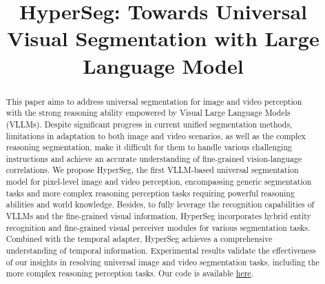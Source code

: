 \title{HyperSeg: Towards Universal Visual Segmentation with Large Language Model}




\renewcommand{\thefootnote}{\fnsymbol{footnote}}

\begin{abstract}
\indent This paper aims to address universal segmentation for image and video perception with the strong reasoning ability empowered by Visual Large Language Models (VLLMs). Despite significant progress in current unified segmentation methods, limitations in adaptation to both image and video scenarios, as well as the complex reasoning segmentation, make it difficult for them to handle various challenging instructions and achieve an accurate understanding of fine-grained vision-language correlations.
We propose HyperSeg, the first VLLM-based universal segmentation model for pixel-level image and video perception, encompassing generic segmentation tasks and more complex reasoning perception tasks requiring powerful reasoning abilities and world knowledge.
Besides, to fully leverage the recognition capabilities of VLLMs and the fine-grained visual information, HyperSeg incorporates hybrid entity recognition and fine-grained visual perceiver modules for various segmentation tasks. 
Combined with the temporal adapter, HyperSeg achieves a comprehensive understanding of temporal information. 
Experimental results validate the effectiveness of our insights in resolving universal image and video segmentation tasks, including the more complex reasoning perception tasks. Our code is available \href{https://github.com/congvvc/HyperSeg}{here}. 
\vspace{-4mm}

\end{abstract}

